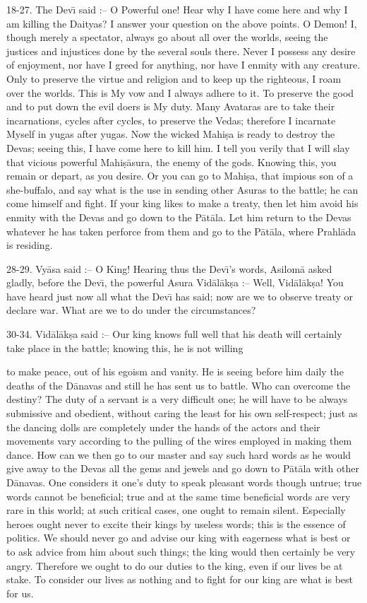 18-27. The Dev\={\i} said :-- O Powerful one! Hear why I have come here and why I am killing the Daityas? I answer your question on the above points. O Demon! I, though merely a spectator, always go about all over the worlds, seeing the justices and injustices done by the several souls there. Never I possess any desire of enjoyment, nor have I greed for anything, nor have I enmity with any creature. Only to preserve the virtue and religion and to keep up the righteous, I roam over the worlds. This is My vow and I always adhere to it. To preserve the good and to put down the evil doers is My duty. Many Avataras are to take their incarnations, cycles after cycles, to preserve the Vedas; therefore I incarnate Myself in yugas after yugas. Now the wicked Mahi\d{s}a is ready to destroy the Devas; seeing this, I have come here to kill him. I tell you verily that I will slay that vicious powerful Mahi\d{s}\=asura, the enemy of the gods. Knowing this, you remain or depart, as you desire. Or you can go to Mahi\d{s}a, that impious son of a she-buffalo, and say what is the use in sending other Asuras to the battle; he can come himself and fight. If your king likes to make a treaty, then let him avoid his enmity with the Devas and go down to the P\=at\=ala. Let him return to the Devas whatever he has taken perforce from them and go to the P\=at\=ala, where Prahl\=ada is residing.

28-29. Vy\=asa said :-- O King! Hearing thus the Dev\={\i}'s words, Asilom\=a asked gladly, before the Dev\={\i}, the powerful Asura Vid\=al\=ak\d{s}a :-- Well, Vid\=al\=ak\d{s}a! You have heard just now all what the Dev\={\i} has said; now are we to observe treaty or declare war. What are we to do under the circumstances?

30-34. Vid\=al\=ak\d{s}a said :-- Our king knows full well that his death will certainly take place in the battle; knowing this, he is not willing

to make peace, out of his egoism and vanity. He is seeing before him daily the deaths of the D\=anavas and still he has sent us to battle. Who can overcome the destiny? The duty of a servant is a very difficult one; he will have to be always submissive and obedient, without caring the least for his own self-respect; just as the dancing dolls are completely under the hands of the actors and their movements vary according to the pulling of the wires employed in making them dance. How can we then go to our master and say such hard words as he would give away to the Devas all the gems and jewels and go down to P\=at\=ala with other D\=anavas. One considers it one's duty to speak pleasant words though untrue; true words cannot be beneficial; true and at the same time beneficial words are very rare in this world; at such critical cases, one ought to remain silent. Especially heroes ought never to excite their kings by useless words; this is the essence of politics. We should never go and advise our king with eagerness what is best or to ask advice from him about such things; the king would then certainly be very angry. Therefore we ought to do our duties to the king, even if our lives be at stake. To consider our lives as nothing and to fight for our king are what is best for us.

